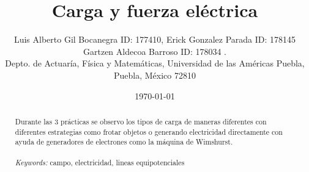 \documentclass{article}
\begin{document}

\renewcommand{\footrulewidth}{1pt}
\renewcommand{\tablename}{Tabla}
\renewcommand{\figurename}{Figura}


\title{Carga y fuerza eléctrica}
\author{\small{Luis Alberto Gil Bocanegra ID: 177410, Erick Gonzalez Parada ID: 178145}\\
 \small{Gartzen Aldecoa Barroso ID: 178034 .}\\		%
	   \small{Depto. de Actuaría, Física y Matemáticas, Universidad de las Américas Puebla, Puebla, M\'exico 72810}}
\date{\small{\today}}

\maketitle


\begin{abstract}
	Durante las 3 prácticas se observo los tipos de carga de maneras diferentes 
	con diferentes estrategias como frotar objetos o generando electricidad directamente 
	con ayuda de generadores de electrones como la máquina de Wimshurst. 
\\
\\
{\it Keywords:}  campo, electricidad, lineas equipotenciales  
\\
\\
\end{abstract}
\end{document}
